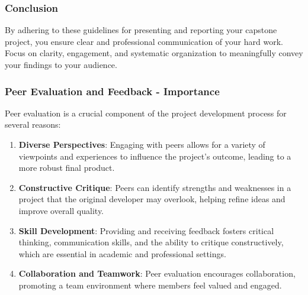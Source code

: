 \documentclass[aspectratio=169]{beamer}
\begin{document}
\begin{frame}[fragile]
    \frametitle{Conclusion}
    By adhering to these guidelines for presenting and reporting your capstone project, you ensure clear and professional communication of your hard work. Focus on clarity, engagement, and systematic organization to meaningfully convey your findings to your audience.
\end{frame}

\begin{frame}[fragile]
    \frametitle{Peer Evaluation and Feedback - Importance}
    Peer evaluation is a crucial component of the project development process for several reasons:
    
    \begin{enumerate}
        \item \textbf{Diverse Perspectives}: Engaging with peers allows for a variety of viewpoints and experiences to influence the project's outcome, leading to a more robust final product.
        
        \item \textbf{Constructive Critique}: Peers can identify strengths and weaknesses in a project that the original developer may overlook, helping refine ideas and improve overall quality.
        
        \item \textbf{Skill Development}: Providing and receiving feedback fosters critical thinking, communication skills, and the ability to critique constructively, which are essential in academic and professional settings.
        
        \item \textbf{Collaboration and Teamwork}: Peer evaluation encourages collaboration, promoting a team environment where members feel valued and engaged.
    \end{enumerate}
\end{frame}
\end{document}
